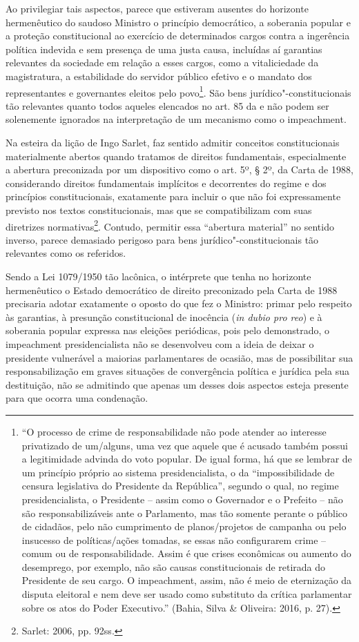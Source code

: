 Ao privilegiar tais aspectos, parece que estiveram ausentes do horizonte
hermenêutico do saudoso Ministro o princípio democrático, a soberania
popular e a proteção constitucional ao exercício de determinados cargos
contra a ingerência política indevida e sem presença de uma justa causa,
incluídas aí garantias relevantes da sociedade em relação a esses
cargos, como a vitaliciedade da magistratura, a estabilidade do servidor
público efetivo e o mandato dos representantes e governantes eleitos
pelo povo\footnote{``O processo de crime de responsabilidade não pode
  atender ao interesse privatizado de um/alguns, uma vez que aquele que
  é acusado também possui a legitimidade advinda do voto popular. De
  igual forma, há que se lembrar de um princípio próprio ao sistema
  presidencialista, o da ``impossibilidade de censura legislativa do
  Presidente da República'', segundo o qual, no regime presidencialista,
  o Presidente -- assim como o Governador e o Prefeito -- não são
  responsabilizáveis ante o Parlamento, mas tão somente perante o
  público de cidadãos, pelo não cumprimento de planos/projetos de
  campanha ou pelo insucesso de políticas/ações tomadas, se essas não
  configurarem crime -- comum ou de responsabilidade. Assim é que crises
  econômicas ou aumento do desemprego, por exemplo, não são causas
  constitucionais de retirada do Presidente de seu cargo. O
  impeachment, assim, não é meio de eternização da disputa
  eleitoral e nem deve ser usado como substituto da crítica parlamentar
  sobre os atos do Poder Executivo.'' (Bahia, Silva \& Oliveira: 2016,
  p. 27).}. São bens jurídico"-constitucionais tão relevantes quanto todos
aqueles elencados no art. 85 da  e não podem ser solenemente ignorados
na interpretação de um mecanismo como o impeachment.

Na esteira da lição de Ingo Sarlet, faz sentido admitir conceitos
constitucionais materialmente abertos quando tratamos de direitos
fundamentais, especialmente a abertura preconizada por um dispositivo
como o art. 5º, § 2º, da Carta de 1988, considerando direitos
fundamentais implícitos e decorrentes do regime e dos princípios
constitucionais, exatamente para incluir o que não foi expressamente
previsto nos textos constitucionais, mas que se compatibilizam com suas
diretrizes normativas\footnote{Sarlet: 2006, pp. 92ss.}. Contudo, permitir essa
``abertura material'' no sentido inverso, parece demasiado perigoso para
bens jurídico"-constitucionais tão relevantes como os referidos.

Sendo a Lei 1079/1950 tão lacônica, o intérprete que tenha no horizonte
hermenêutico o Estado democrático de direito preconizado pela Carta de
1988 precisaria adotar exatamente o oposto do que fez o Ministro: primar
pelo respeito às garantias, à presunção constitucional de inocência
(\emph{in dubio pro reo}) e à soberania popular expressa nas eleições
periódicas, pois pelo demonstrado, o impeachment presidencialista
não se desenvolveu com a ideia de deixar o presidente vulnerável a
maiorias parlamentares de ocasião, mas de possibilitar sua
responsabilização em graves situações de convergência política e
jurídica pela sua destituição, não se admitindo que apenas um desses
dois aspectos esteja presente para que ocorra uma condenação.

